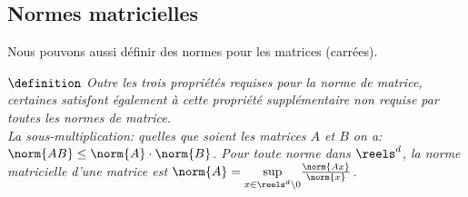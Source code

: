 \subsection{Normes matricielles}
Nous pouvons aussi définir des normes pour les matrices (carrées).

$\definition   $   \textit{Outre les trois propriétés requises pour la norme de matrice, certaines satisfont également à cette propriété supplémentaire non requise par toutes les normes de matrice.\\
La sous-multiplication: quelles que soient les matrices $A$ et $B$ on a: \;$\norm {AB} \leq \norm {A} \cdot \norm{B}$.
Pour toute norme dans $\reels^{d}$, la norme matricielle d'une matrice est $\norm{A} =\underset{x \in \reels^{d}\backslash 0 } \sup \frac{\norm{Ax}}{\norm{x}} $.}










